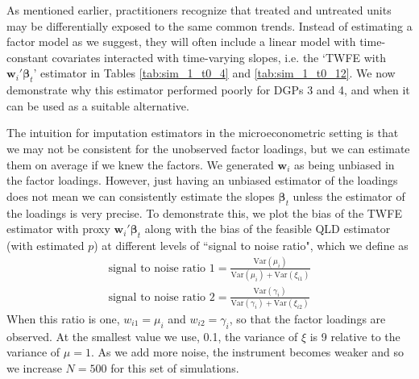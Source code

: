 \documentclass[12pt]{article}
\begin{document}
As mentioned earlier, practitioners recognize that treated and untreated units may be differentially exposed to the same common trends. Instead of estimating a factor model as we suggest, they will often include a linear model with time-constant covariates interacted with time-varying slopes, i.e. the `TWFE with $\bm w_i' \bm \beta_t$' estimator in Tables \ref{tab:sim_1_t0_4} and \ref{tab:sim_1_t0_12}. We now demonstrate why this estimator performed poorly for DGPs 3 and 4, and when it can be used as a suitable alternative.

The intuition for imputation estimators in the microeconometric setting is that we may not be consistent for the unobserved factor loadings, but we can estimate them on average if we knew the factors. We generated $\bm w_i$ as being unbiased in the factor loadings. However, just having an unbiased estimator of the loadings does not mean we can consistently estimate the slopes $\bm \beta_t$ unless the estimator of the loadings is very precise. To demonstrate this, we plot the bias of the TWFE estimator with proxy $\bm w_i' \bm \beta_t$ along with the bias of the feasible QLD estimator (with estimated $p$) at different levels of ``signal to noise ratio", which we define as 
\begin{gather}
    \text{signal to noise ratio 1} = \frac{\text{Var}(\mu_i)}{\text{Var}(\mu_i) + \text{Var}(\xi_{i1})}\\
    \text{signal to noise ratio 2} = \frac{\text{Var}(\gamma_i)}{\text{Var}(\gamma_i) + \text{Var}(\xi_{i2})}
\end{gather}
When this ratio is one, $w_{i1} = \mu_i$ and $w_{i2} = \gamma_i$, so that the factor loadings are observed. At the smallest value we use, 0.1, the variance of $\xi$ is 9 relative to the variance of $\mu = 1$. As we add more noise, the instrument becomes weaker and so we increase $N = 500$ for this set of simulations.
\end{document}
